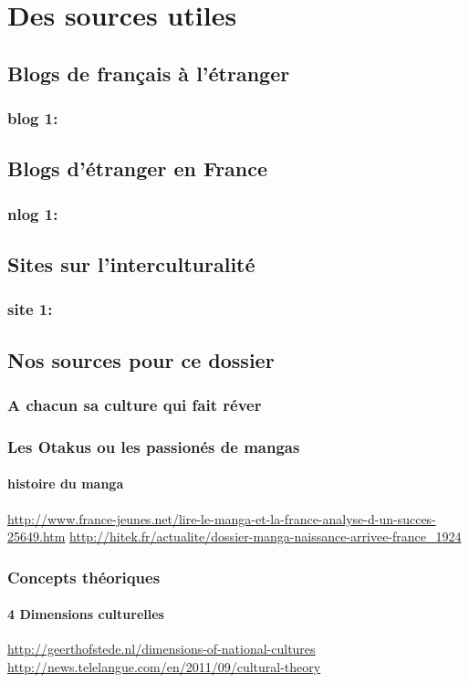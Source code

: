 \part{Des sources utiles}

\chapter{Blogs de français à l'étranger}
\section{blog 1:}


\chapter{Blogs d'étranger en France}
\section{nlog 1:}

\chapter{Sites sur l'interculturalité}
\section{site 1:}


\chapter{Nos sources pour ce dossier}
\section{A chacun sa culture qui fait réver}
\section{Les Otakus ou les passionés de mangas}
\subsection{histoire du manga}
\noindent\url{http://www.france-jeunes.net/lire-le-manga-et-la-france-analyse-d-un-succes-25649.htm}
\newline
\url{http://hitek.fr/actualite/dossier-manga-naissance-arrivee-france_1924}

\section{Concepts théoriques}
\subsection{4 Dimensions culturelles}
\noindent\url{http://geerthofstede.nl/dimensions-of-national-cultures}
\newline
\url{http://news.telelangue.com/en/2011/09/cultural-theory}